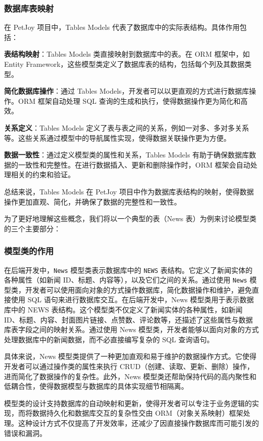 \subsubsection{数据库表映射}

在 PetJoy 项目中，Tables Models 代表了数据库中的实际表结构。具体作用包括：

\textbf{表结构映射}：Tables Models 类直接映射到数据库中的表。在 ORM 框架中，如 Entity Framework，这些模型类定义了数据库表的结构，包括每个列及其数据类型。

\textbf{简化数据库操作}：通过 Tables Models，开发者可以以更直观的方式进行数据库操作。ORM 框架自动处理 SQL 查询的生成和执行，使得数据操作更为简化和高效。

\textbf{关系定义}：Tables Models 定义了表与表之间的关系，例如一对多、多对多关系等。这些关系通过模型中的导航属性实现，使得数据关联操作更为方便。

\textbf{数据一致性}：通过定义模型类的属性和关系，Tables Models 有助于确保数据库数据的一致性和完整性。在进行数据插入、更新和删除操作时，ORM 框架会自动处理相关的约束和验证。


总结来说，Tables Models 在 PetJoy 项目中作为数据库表结构的映射，使得数据操作更加直观、简化，并确保了数据的完整性和一致性。

为了更好地理解这些概念，我们将以一个典型的表（News 表）为例来讨论模型类的三个主要部分：

\subsubsection{模型类的作用}

在后端开发中，\texttt{News} 模型类表示数据库中的 \texttt{NEWS} 表结构。它定义了新闻实体的各种属性（如新闻 ID、标题、内容等），以及它们之间的关系。通过使用 \texttt{News} 模型类，开发者可以使用面向对象的方式操作数据库，简化数据操作和维护，避免直接使用 SQL 语句来进行数据库交互。在后端开发中，News 模型类用于表示数据库中的 NEWS 表结构。这个模型类不仅定义了新闻实体的各种属性，如新闻 ID、标题、内容、封面图片链接、点赞数、评论数等，还描述了这些属性与数据库表字段之间的映射关系。通过使用 News 模型类，开发者能够以面向对象的方式处理数据库中的新闻数据，而不必直接编写复杂的 SQL 查询语句。

具体来说，News 模型类提供了一种更加直观和易于维护的数据操作方式。它使得开发者可以通过操作类的属性来执行 CRUD（创建、读取、更新、删除）操作，进而简化了数据操作的复杂性。此外，News 模型类还帮助保持代码的高内聚性和低耦合性，使得数据模型与数据库的具体实现细节相隔离。

模型类的设计支持数据库的自动映射和更新，使得开发者可以专注于业务逻辑的实现，而将数据持久化和数据库交互的复杂性交由 ORM（对象关系映射）框架处理。这种设计方式不仅提高了开发效率，还减少了因直接操作数据库而可能引发的错误和漏洞。

